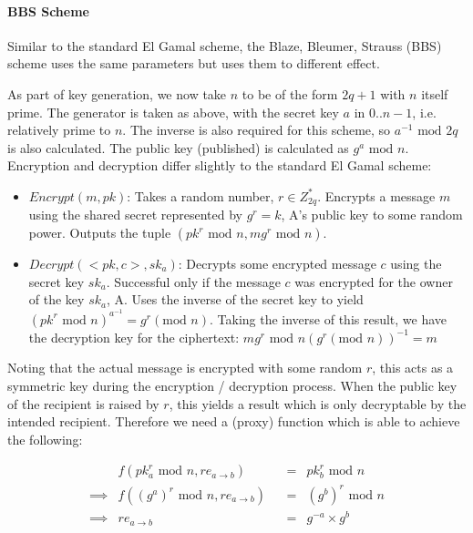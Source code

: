 \paragraph{BBS Scheme}

Similar to the standard El Gamal scheme, the Blaze, Bleumer, Strauss (BBS) scheme uses the same parameters but uses them to different effect.

As part of key generation, we now take $n$ to be of the form $2q + 1$ with $n$ itself prime. The generator is taken as above, with the secret key $a$ in ${0..n - 1}$, i.e. relatively prime to $n$. The inverse is also required for this scheme, so $a^{-1} \text{ mod } 2q$ is also calculated. The public key (published) is calculated as $g^a \text{ mod } n$. Encryption and decryption differ slightly to the standard El Gamal scheme:

\begin{itemize}
  \item $Encrypt(m, pk)$: Takes a random number, $r \in Z_{2q}^*$. Encrypts a message $m$ using the shared secret represented by $g^r = k$, A's public key to some random power. Outputs the tuple $(pk^r \text{ mod } n, mg^r \text{ mod } n)$.
  \item $Decrypt(<pk, c>, sk_a)$: Decrypts some encrypted message $c$ using the secret key $sk_a$. Successful only if the message $c$ was encrypted for the owner of the key $sk_a$, A. Uses the inverse of the secret key to yield $(pk^r \text{ mod } n)^{a^{-1}} = g^r (\text{mod } n)$. Taking the inverse of this result, we have the decryption key for the ciphertext: $mg^r \text{ mod } n(g^r (\text{mod } n))^{-1} = m$
\end{itemize}

Noting that the actual message is encrypted with some random $r$, this acts as a symmetric key during the encryption / decryption process. When the public key of the recipient is raised by $r$, this yields a result which is only decryptable by the intended recipient. Therefore we need a (proxy) function which is able to achieve the following:

$$
\begin{align}
& f(pk_a^r \text{ mod } n, re_{a \rightarrow b}) & &=& pk_b^r \text{ mod } n \\
\implies & f((g^a)^r \text{ mod } n, re_{a \rightarrow b}) & &=& (g^b)^r \text{ mod } n \\
\implies & re_{a \rightarrow b} & &=& g^{-a} \times g^{b}
\end{align}
$$

